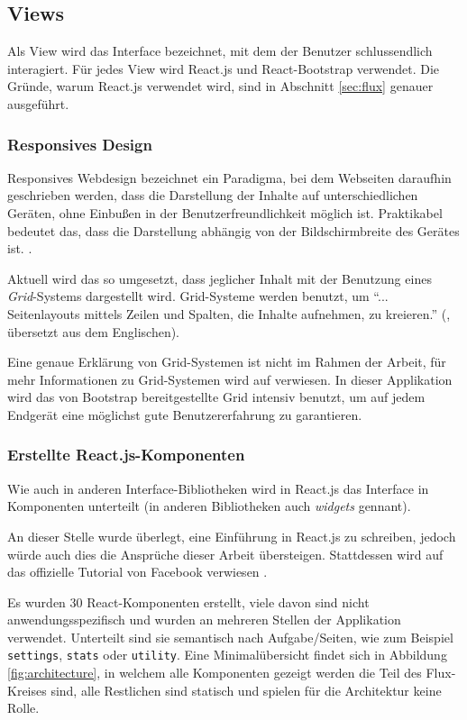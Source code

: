 \documentclass[12pt,twoside]{book}
\begin{document}
\subsection{Views}

Als View wird das Interface bezeichnet, mit dem der Benutzer schlussendlich interagiert. Für jedes View wird React.js und React-Bootstrap verwendet. Die Gründe, warum React.js verwendet wird, sind in Abschnitt \ref{sec:flux} genauer ausgeführt.

\subsubsection*{Responsives Design}

Responsives Webdesign bezeichnet ein Paradigma, bei dem Webseiten daraufhin geschrieben werden, dass die Darstellung der Inhalte auf unterschiedlichen Geräten, ohne Einbußen in der Benutzerfreundlichkeit möglich ist. Praktikabel bedeutet das, dass die Darstellung abhängig von der Bildschirmbreite des Gerätes ist. \cite{natda2013responsive}.

Aktuell wird das so umgesetzt, dass jeglicher Inhalt mit der Benutzung eines \textit{Grid}-Systems dargestellt wird. Grid-Systeme werden benutzt, um ``... Seitenlayouts mittels Zeilen und Spalten, die Inhalte aufnehmen, zu kreieren.'' (\cite{bootstrap}, übersetzt aus dem Englischen).

Eine genaue Erklärung von Grid-Systemen ist nicht im Rahmen der Arbeit, für mehr Informationen zu Grid-Systemen wird auf \cite{bootstrap} verwiesen.
In dieser Applikation wird das von Bootstrap bereitgestellte Grid intensiv benutzt, um auf jedem Endgerät eine möglichst gute Benutzererfahrung zu garantieren.

\subsubsection*{Erstellte React.js-Komponenten}

Wie auch in anderen Interface-Bibliotheken wird in React.js das Interface in Komponenten unterteilt (in anderen Bibliotheken auch \textit{widgets} gennant).

An dieser Stelle wurde überlegt, eine Einführung in React.js zu schreiben, jedoch würde auch dies die Ansprüche dieser Arbeit übersteigen. Stattdessen wird auf das offizielle Tutorial von Facebook verwiesen \cite{tutorial}.

Es wurden 30 React-Komponenten erstellt, viele davon sind nicht anwendungsspezifisch und wurden an mehreren Stellen der Applikation verwendet. Unterteilt sind sie semantisch nach Aufgabe/Seiten, wie zum Beispiel \texttt{settings}, \texttt{stats} oder \texttt{utility}.
Eine Minimalübersicht findet sich in Abbildung \ref{fig:architecture}, in welchem alle Komponenten gezeigt werden die Teil des Flux-Kreises sind, alle Restlichen sind statisch und spielen für die Architektur keine Rolle.
\end{document}
